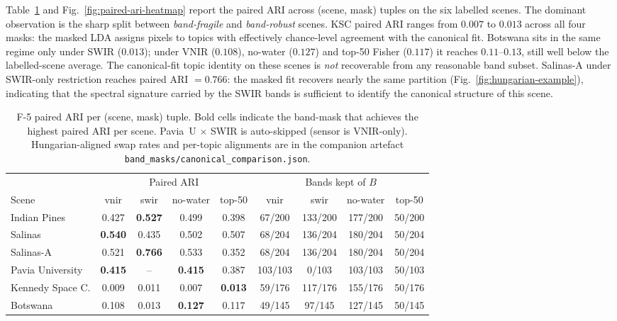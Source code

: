 \documentclass[journal,a4paper,10pt]{IEEEtran}
\begin{document}
Table~\ref{tab:b5-band-mask} and Fig.~\ref{fig:paired-ari-heatmap}
report the paired ARI across (scene,
mask) tuples on the six labelled scenes. The dominant observation is
the sharp split between \emph{band-fragile} and \emph{band-robust}
scenes. KSC paired ARI ranges from $0.007$ to $0.013$ across all four
masks: the masked LDA assigns pixels to topics with effectively
chance-level agreement with the canonical fit. Botswana sits in the
same regime only under SWIR ($0.013$); under VNIR ($0.108$), no-water
($0.127$) and top-50 Fisher ($0.117$) it reaches $0.11$--$0.13$, still
well below the labelled-scene average. The canonical-fit topic
identity on these scenes is \emph{not} recoverable from any
reasonable band subset. Salinas-A under SWIR-only restriction reaches
paired ARI $=0.766$: the masked fit recovers nearly the same
partition (Fig.~\ref{fig:hungarian-example}), indicating that the spectral signature carried by the
SWIR bands is sufficient to identify the canonical structure of this
scene.

\begin{table}[t]
\caption{F-5 paired ARI per (scene, mask) tuple. Bold cells indicate
the band-mask that achieves the highest paired ARI per scene.
Pavia~U $\times$ SWIR is auto-skipped (sensor is VNIR-only).
Hungarian-aligned swap rates and per-topic alignments are in the
companion artefact \texttt{band\_masks/canonical\_comparison.json}.}
\label{tab:b5-band-mask}
\centering
\small
\begin{tabular}{lcccccccc}
\toprule
 & \multicolumn{4}{c}{Paired ARI} & \multicolumn{4}{c}{Bands kept of $B$} \\
\cmidrule(lr){2-5}\cmidrule(lr){6-9}
Scene & vnir & swir & no-water & top-50 & vnir & swir & no-water & top-50 \\
\midrule
Indian Pines     & 0.427 & \textbf{0.527} & 0.499 & 0.398 & 67/200 & 133/200 & 177/200 & 50/200 \\
Salinas          & \textbf{0.540} & 0.435 & 0.502 & 0.507 & 68/204 & 136/204 & 180/204 & 50/204 \\
Salinas-A        & 0.521 & \textbf{0.766} & 0.533 & 0.352 & 68/204 & 136/204 & 180/204 & 50/204 \\
Pavia University & \textbf{0.415} & --    & \textbf{0.415} & 0.387 & 103/103 & 0/103  & 103/103 & 50/103 \\
Kennedy Space C. & 0.009 & 0.011 & 0.007 & \textbf{0.013} & 59/176 & 117/176 & 155/176 & 50/176 \\
Botswana         & 0.108 & 0.013 & \textbf{0.127} & 0.117 & 49/145 & 97/145  & 127/145 & 50/145 \\
\bottomrule
\end{tabular}
\end{table}
\end{document}
